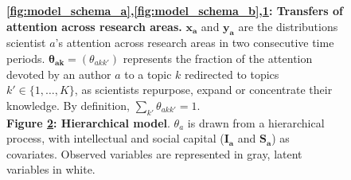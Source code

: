 \documentclass{article}
\begin{document}
\begin{figure}[h]
\begin{subfigure}[b]{0.25\textwidth}
{
          }  
          \caption{\label{fig:model_schema_c}}
     \end{subfigure}\hfill%
\begin{subfigure}[b]{0.22\textwidth}
    \centering
    \caption{\label{fig:model_structure}}
\end{subfigure}

     \caption{\textbf{\ref{fig:model_schema_a},\ref{fig:model_schema_b},\ref{fig:model_schema_c}: Transfers of attention across research areas.} $\bm{x_a}$ and $\bm{y_a}$ are the distributions scientist $a$'s attention across research areas in two consecutive time periods. $\bm{\theta_{ak}}=(\theta_{akk'})$ represents the fraction of the attention devoted by an author $a$ to a topic $k$ redirected to topics $k' \in \{1,\dots,K\}$, as scientists repurpose, expand or concentrate their knowledge. By definition, $\sum_{k'} \theta_{akk'}=1$. %
     \\
     \textbf{Figure \ref{fig:model_structure}: Hierarchical model}. $\theta_a$ is drawn from a hierarchical process, with intellectual and social capital ($\bm{I_a}$ and $\bm{S_a}$) as covariates. Observed variables are represented in gray, latent variables in white.}
     \label{fig:ei}
 \end{figure}
\end{document}
